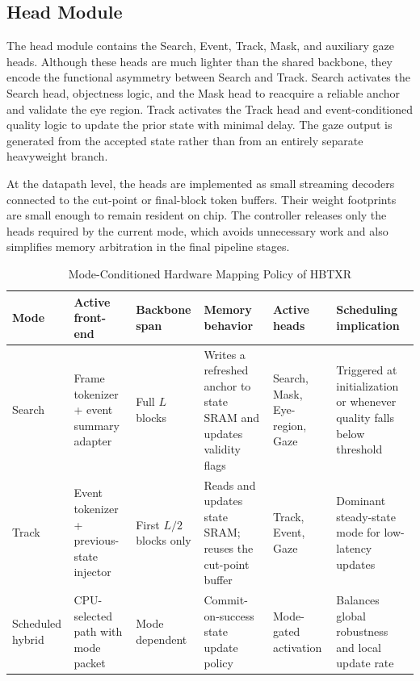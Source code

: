 \documentclass[journal]{IEEEtran}
\begin{document}
\subsection{Head Module}
The head module contains the Search, Event, Track, Mask, and auxiliary gaze heads. Although these heads are much lighter than the shared backbone, they encode the functional asymmetry between Search and Track. Search activates the Search head, objectness logic, and the Mask head to reacquire a reliable anchor and validate the eye region. Track activates the Track head and event-conditioned quality logic to update the prior state with minimal delay. The gaze output is generated from the accepted state rather than from an entirely separate heavyweight branch.

At the datapath level, the heads are implemented as small streaming decoders connected to the cut-point or final-block token buffers. Their weight footprints are small enough to remain resident on chip. The controller releases only the heads required by the current mode, which avoids unnecessary work and also simplifies memory arbitration in the final pipeline stages.

\begin{table}[t]
\caption{Mode-Conditioned Hardware Mapping Policy of HBTXR}
\label{tab:mapping}
\centering
\small
\begin{tabularx}{\textwidth}{@{}L{0.10\textwidth}L{0.18\textwidth}L{0.15\textwidth}L{0.19\textwidth}L{0.16\textwidth}Y@{}}
\toprule
Mode & Active front-end & Backbone span & Memory behavior & Active heads & Scheduling implication \\
\midrule
Search & Frame tokenizer + event summary adapter & Full $L$ blocks & Writes a refreshed anchor to state SRAM and updates validity flags & Search, Mask, Eye-region, Gaze & Triggered at initialization or whenever quality falls below threshold \\
Track & Event tokenizer + previous-state injector & First $L/2$ blocks only & Reads and updates state SRAM; reuses the cut-point buffer & Track, Event, Gaze & Dominant steady-state mode for low-latency updates \\
Scheduled hybrid & CPU-selected path with mode packet & Mode dependent & Commit-on-success state update policy & Mode-gated activation & Balances global robustness and local update rate \\
\bottomrule
\end{tabularx}
\end{table}
\end{document}
